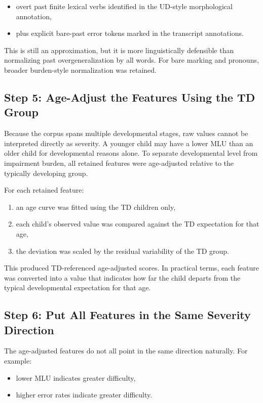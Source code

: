 \begin{itemize}
    \item overt past finite lexical verbs identified in the UD-style morphological annotation,
    \item plus explicit bare-past error tokens marked in the transcript annotations.
\end{itemize}

This is still an approximation, but it is more linguistically defensible than normalizing past overgeneralization by all words. For bare marking and pronouns, broader burden-style normalization was retained.

\subsection{Step 5: Age-Adjust the Features Using the TD Group}

Because the corpus spans multiple developmental stages, raw values cannot be interpreted directly as severity. A younger child may have a lower MLU than an older child for developmental reasons alone. To separate developmental level from impairment burden, all retained features were age-adjusted relative to the typically developing group.

For each retained feature:

\begin{enumerate}
    \item an age curve was fitted using the TD children only,
    \item each child's observed value was compared against the TD expectation for that age,
    \item the deviation was scaled by the residual variability of the TD group.
\end{enumerate}

This produced TD-referenced age-adjusted scores. In practical terms, each feature was converted into a value that indicates how far the child departs from the typical developmental expectation for that age.

\subsection{Step 6: Put All Features in the Same Severity Direction}

The age-adjusted features do not all point in the same direction naturally. For example:

\begin{itemize}
    \item lower MLU indicates greater difficulty,
    \item higher error rates indicate greater difficulty.
\end{itemize}

